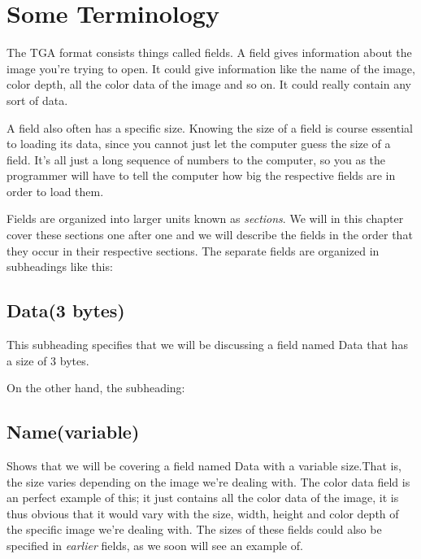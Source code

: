   \section{Some Terminology}

  The TGA format consists things called fields. A field
  gives information about the image you're trying to open. It could
  give information like the name of the image, color depth, all the
  color data of the image and so on. It could really contain any sort
  of data.

  A field also often has a specific size. Knowing the size of a field
  is course essential to loading its data, since you cannot just let
  the computer guess the size of a field. It's all just a long sequence
  of numbers to the computer, so you as the programmer will have to
  tell the computer how big the respective fields are in order to load
  them.

  \newcommand{\plural}[3]{\ifstrequal{#1}{1}{#2}{#3}}
  \newcommand{\fieldlength}[1]{\ifstrequal{#1}{0}{variable}{#1 \plural{#1}{byte}{bytes}}}
  \newcommand{\imgfield}[2]{\subsection*{#1(\fieldlength{#2})}}
  \newcommand{\imgsubfield}[2]{\subsubsection*{#1(\fieldlength{#2})}}

  Fields are organized into larger units known as
  \textit{sections}. We will in this chapter cover
  these sections one after one and we will describe the fields in the
  order that they occur in their respective sections. The separate
  fields are organized in subheadings like this:

  \imgfield{Data}{3}

  This subheading specifies that we will be discussing a field named
  Data that has a size of 3 bytes.

  On the other hand, the subheading:

  \imgfield{Name}{0}

  Shows that we will be covering a field named Data with a variable
  size.That is, the size varies depending on the image we're
  dealing with. The color data field is an perfect example of this; it
  just contains all the color data of the image, it is thus obvious
  that it would vary with the size, width, height and color depth of
  the specific image we're dealing with. The sizes of these fields
  could also be specified in \textit{earlier} fields, as we soon will see an
  example of.

